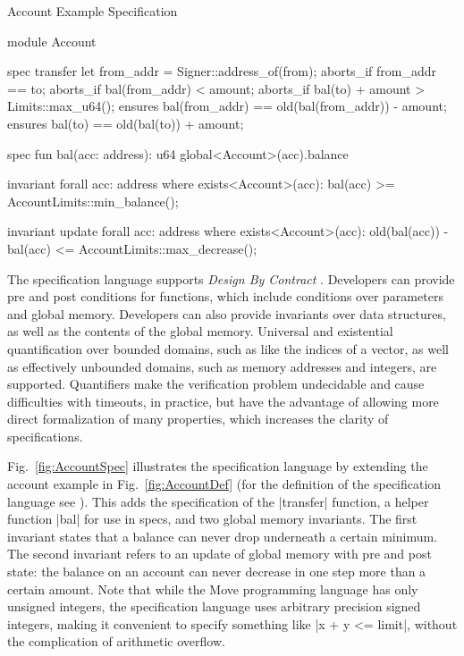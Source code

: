 \begin{Figure}
\caption{\label{fig:AccountSpec} Account Example Specification}
\begin{MoveBox}
module Account {
  spec transfer {
    let from_addr = Signer::address_of(from);
    aborts_if from_addr == to;
    aborts_if bal(from_addr) < amount;
    aborts_if bal(to) + amount > Limits::max_u64();
    ensures bal(from_addr) == old(bal(from_addr)) - amount;
    ensures bal(to) == old(bal(to)) + amount;
  }

  spec fun bal(acc: address): u64 {
    global<Account>(acc).balance
  }

  invariant forall acc: address where exists<Account>(acc):
    bal(acc) >= AccountLimits::min_balance();

  invariant update forall acc: address where exists<Account>(acc):
    old(bal(acc)) - bal(acc) <= AccountLimits::max_decrease();
}
\end{MoveBox}
\end{Figure}

\noindent The specification language supports {\em Design By Contract}
\cite{DESIGN_BY_CONTRACT}. Developers can provide pre and post conditions for
functions, which include conditions over
parameters and global
memory. Developers can also provide invariants over data structures, as well as
the
contents of the global memory.
Universal and existential
quantification %
over bounded domains, such as like the indices of a vector, as well as
effectively unbounded domains, such as memory addresses and integers, are
supported. Quantifiers make the verification problem undecidable
and cause difficulties with timeouts, in practice, but have the advantage
of allowing more direct formalization of many properties, which increases the
clarity of specifications.

Fig.~\ref{fig:AccountSpec} illustrates the specification language by extending
the account example in Fig.~\ref{fig:AccountDef} (for the definition of the
specification language see \cite{MOVE_SPEC_LANG_DEF}). This adds the
specification of the |transfer| function, a helper function |bal| for use in
specs, and two global memory invariants. The first invariant states that a
balance can never drop underneath a certain minimum. The second invariant refers
to an update of global memory with pre and post state: the balance on an account
can never decrease in one step more than a certain amount.  Note that while the
Move programming language has only unsigned integers, the specification language
uses arbitrary precision signed integers, making it convenient to specify
something like |x + y <= limit|,
without the complication of arithmetic overflow.

